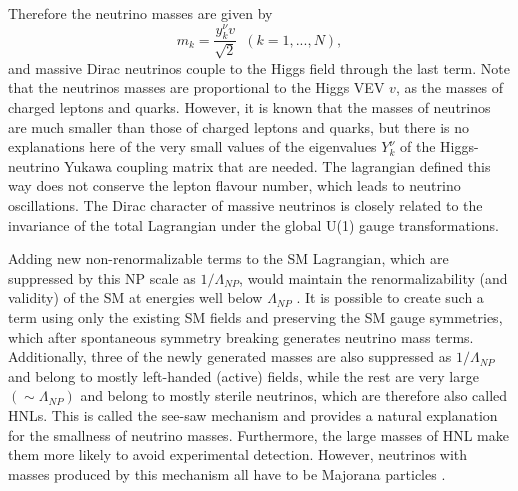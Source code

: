 Therefore the neutrino masses are given by
\begin{equation}
m_k=\frac{y_k^\nu v}{\sqrt{2}}\,\,\,\left(k=1,...,N\right),
\end{equation}
and massive Dirac neutrinos couple to the Higgs field through the last term. Note that the neutrinos masses are proportional to the Higgs VEV $v$, as the masses of charged leptons and quarks. However, it is known that the masses of neutrinos are much smaller than those of charged leptons and quarks, but there is no explanations here of the very small values of the eigenvalues $Y_k^{\nu}$ of the Higgs-neutrino Yukawa coupling matrix that are needed. The lagrangian defined this way does not conserve the lepton flavour number, which leads to neutrino oscillations. The Dirac character of massive neutrinos is closely related to the invariance of the total Lagrangian under the global U(1) gauge transformations.
\fi


Adding new non-renormalizable terms to the \gls{SM} Lagrangian, which are suppressed by this \gls{NP} scale as $1/\Lambda_{NP}$, would maintain the renormalizability (and validity) of the \gls{SM} at energies well below $\Lambda_{NP}$ \cite{Gonzalez-GarciaPhenomenologyMassiveNu.pdf}. It is possible to create such a term using only the existing \gls{SM} fields and preserving the \gls{SM} gauge symmetries, which after spontaneous symmetry breaking generates neutrino mass terms. Additionally, three of the newly generated masses are also suppressed as $1/\Lambda_{NP}$ and belong to mostly left-handed (active) fields, while the rest are very large $\left(\sim\Lambda_{NP}\right)$ and belong to mostly sterile neutrinos, which are therefore also called \glspl{HNL}. This is called the see-saw mechanism \cite{SeeSawMechanism1979.pdf} and provides a natural explanation for the smallness of neutrino masses. Furthermore, the large masses of \gls{HNL} make them more likely to avoid experimental detection. However, neutrinos with masses produced by this mechanism all have to be Majorana particles \cite{MajoranaOriginalPaper.pdf}.


